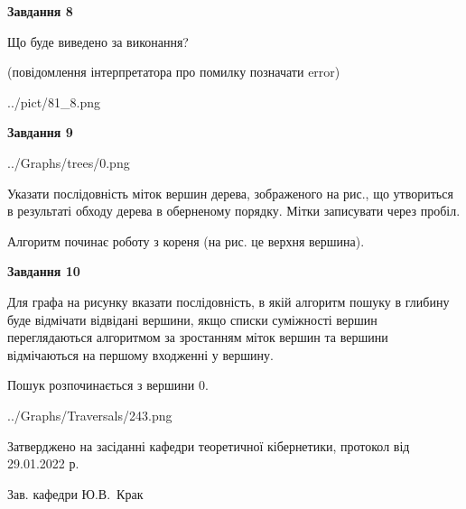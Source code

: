 \documentclass[12pt, ukrainian]{article}
\begin{document}
{\begin {large}
{\begin {center}\textbf{Завдання 8}\end {center}}\par
Що буде виведено за виконання?\par
 (повідомлення інтерпретатора про помилку позначати error)\par
\begin{center}
	{../pict/81_8.png}
\end{center}
\newpage

{\begin {center}\textbf{Завдання 9}\end {center}}\par

\begin{center}
	{../Graphs/trees/0.png}
\end{center}
Указати послідовність міток вершин дерева, зображеного на рис., що утвориться в результаті обходу дерева в оберненому порядку. Мітки записувати через пробіл.\par Алгоритм починає роботу з кореня (на рис. це верхня вершина).\par
\newpage

{\begin {center}\textbf{Завдання 10}\end {center}}\par
Для графа на рисунку вказати послідовність, в якій алгоритм пошуку в глибину буде відмічати відвідані вершини, якщо списки суміжності вершин переглядаються алгоритмом за зростанням міток вершин та вершини відмічаються на першому вход\-женні у вершину.\par
Пошук розпочинається з вершини 0.\par

\begin{center}
	{../Graphs/Traversals/243.png}
\end{center}\par
\newpage


\end {large}
}
{\smallskip \begin {small} Затверджено на засіданні кафедри теоретичної кібернетики, протокол  від   29.01.2022 р.\par\smallskip\smallskip
{\parbox {6.5 cm}{Зав. кафедри \dotfill Ю.В.~Крак}} \end{small}}
\end{document}
